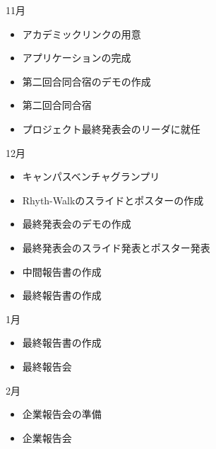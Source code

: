 11月
\begin{itemize}
\item アカデミックリンクの用意
\item アプリケーションの完成
\item 第二回合同合宿のデモの作成
\item 第二回合同合宿
\item プロジェクト最終発表会のリーダに就任
\end{itemize}
12月
\begin{itemize}
\item キャンパスベンチャグランプリ
\item Rhyth-Walkのスライドとポスターの作成
\item 最終発表会のデモの作成
\item 最終発表会のスライド発表とポスター発表
\item 中間報告書の作成
\item 最終報告書の作成
\end{itemize}
1月
\begin{itemize}
\item 最終報告書の作成
\item 最終報告会
\end{itemize}
2月
\begin{itemize}
\item 企業報告会の準備
\item 企業報告会
\end{itemize}
